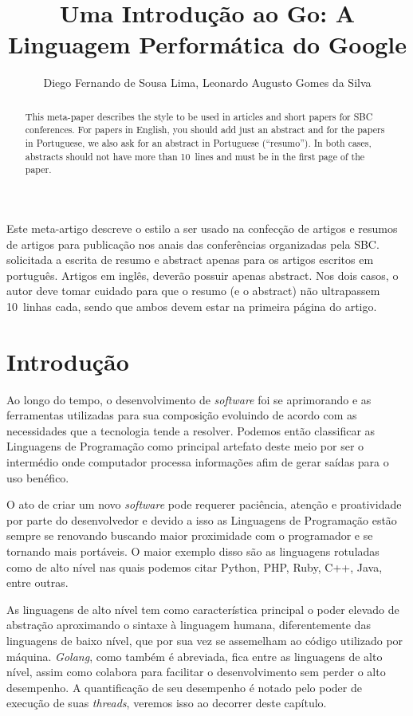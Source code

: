 \documentclass{SBCbookchapter}
\author{Diego Fernando de Sousa Lima, Leonardo Augusto Gomes da Silva}
\title{Uma Introdução ao Go: A Linguagem Performática do Google}
\begin{document}
\maketitle

\begin{abstract}
This meta-paper describes the style to be used in articles and short
papers for SBC conferences. For papers in English, you should add just
an abstract and for the papers in Portuguese, we also ask for an
abstract in Portuguese (``resumo''). In both cases, abstracts should not
have more than 10~lines and must be in the first page of the paper.
\end{abstract}

\begin{resumo}
\begin{otherlanguage}{brazilian}
Este meta-artigo descreve o estilo a ser usado na confecção de artigos
e resumos de artigos para publicação nos anais das conferências
organizadas pela SBC.  solicitada a escrita de resumo e abstract apenas
para os artigos escritos em português. Artigos em inglês, deverão
possuir apenas abstract. Nos dois casos, o autor deve tomar cuidado para
que o resumo (e o abstract) não ultrapassem 10~linhas cada, sendo que
ambos devem estar na primeira página do artigo.
\end{otherlanguage}
\end{resumo}

\section{Introdução}

Ao longo do tempo, o desenvolvimento de \textit{software} foi se aprimorando e as ferramentas utilizadas para sua composição evoluindo de acordo com as necessidades que a tecnologia tende a resolver. Podemos então classificar as Linguagens de Programação como principal artefato deste meio por ser o intermédio onde computador processa informações afim de gerar saídas para o uso benéfico.

O ato de criar um novo \textit{software} pode requerer paciência, atenção e proatividade por parte do desenvolvedor e devido a isso as Linguagens de Programação estão sempre se renovando buscando maior proximidade com o programador e se tornando mais portáveis. O maior exemplo disso são as linguagens rotuladas como de alto nível nas quais podemos citar Python, PHP, Ruby, C++, Java, entre outras.

As linguagens de alto nível tem como característica principal o poder elevado de abstração aproximando o sintaxe à linguagem humana, diferentemente das linguagens de baixo nível, que por sua vez se assemelham ao código utilizado por máquina. \textit{Golang}, como também é abreviada, fica entre as linguagens de alto nível, assim como colabora para facilitar o desenvolvimento sem perder o alto desempenho. A quantificação de seu desempenho é notado pelo poder de execução de suas \textit{threads}, veremos isso ao decorrer deste capítulo. 
\end{document}
